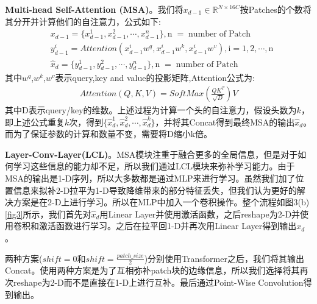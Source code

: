 \textbf{Multi-head Self-Attention (MSA)}。我们将$x_{d-1} \in \mathbb{R}^{N \times 16C}$按Patches的个数将其分开并计算他们的自注意力，公式如下:
\begin{equation}
\begin{aligned}
&x_{d-1} = \{x^1_{d-1},x^2_{d-1},\cdots,x^n_{d-1}\}, \mathrm{n\;=\;number\;of\;Patch} \\
&y^i_{d-1} = Attention(x^i_{d-1}w^q,x^i_{d-1}w^k,x^i_{d-1}w^v), \mathrm{i=1,2,\cdots,n} \\
&\hat{x}_{d} = \{y^1_{d-1},y^2_{d-1},\cdots,y^n_{d-1}\},\mathrm{n\;=\;number\;of\;Patch} 
\end{aligned}\end{equation}
其中$w^q$,$w^k$,$w^v$表示query,key and value的投影矩阵,Attention公式为:
\begin{equation}
\begin{aligned}
Attention(Q,K,V) = SoftMax(\frac{QK^T}{\sqrt{D}})V
\end{aligned}\end{equation}
其中D表示query/key的维数。上述过程为计算一个头的自注意力，假设头数为$k$，即上述公式重复$k$次，得到$\{\hat{x}^1_{d},\hat{x}^2_{d},\cdots,\hat{x}^k_{d}\}$，并将其Concat得到最终MSA的输出$\hat{x}_{d}$。而为了保证参数的计算和数量不变，需要将D缩小k倍。\par
\textbf{Layer-Conv-Layer(LCL)}。MSA模块注重于融合更多的全局信息，但是对于如何学习这些信息的能力却不足，所以我们通过LCL模块来弥补学习能力。由于MSA的输出是1-D序列，所以大多数都是通过MLP来进行学习。虽然我们加了位置信息来拟补2-D拉平为1-D导致降维带来的部分特征丢失，但我们认为更好的解决方案是在2-D上进行学习。所以在MLP中加入一个卷积操作。整个流程如图3(b)\ref{fig3}所示，我们首先对$\hat{x}_{d}$用Linear Layer并使用激活函数，之后reshape为2-D并使用卷积和激活函数进行学习。之后在拉平回1-D并再次用Linear Layer得到输出$x_d$。\par

两种方案($shift=0$和$shift=\frac{patch\_size}{2}$)分别使用Transformer之后，我们将其输出Concat。使用两种方案是为了互相弥补patch块的边缘信息，所以我们选择将其再次reshape为2-D而不是直接在1-D上进行互补。最后通过Point-Wise Convolution\cite{2017Xception}得到输出。\par

